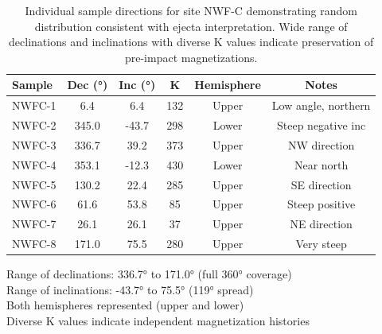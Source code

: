 
\begin{table}[htbp]
    \centering
    \caption{Individual sample directions for site NWF-C demonstrating random distribution consistent with ejecta interpretation. Wide range of declinations and inclinations with diverse K values indicate preservation of pre-impact magnetizations.}
    \label{tab:nwfc_details}
    \footnotesize
    \begin{tabular}{|l|c|c|c|c|c|}
        \hline
        \textbf{Sample} & \textbf{Dec (°)} & \textbf{Inc (°)} & \textbf{K} & \textbf{Hemisphere} & \textbf{Notes} \\
        \hline
        NWFC-1 & 6.4 & 6.4 & 132 & Upper & Low angle, northern \\
        NWFC-2 & 345.0 & -43.7 & 298 & Lower & Steep negative inc \\
        NWFC-3 & 336.7 & 39.2 & 373 & Upper & NW direction \\
        NWFC-4 & 353.1 & -12.3 & 430 & Lower & Near north \\
        NWFC-5 & 130.2 & 22.4 & 285 & Upper & SE direction \\
        NWFC-6 & 61.6 & 53.8 & 85 & Upper & Steep positive \\
        NWFC-7 & 26.1 & 26.1 & 37 & Upper & NE direction \\
        NWFC-8 & 171.0 & 75.5 & 280 & Upper & Very steep \\
        \hline
    \end{tabular}
    
    \vspace{0.5em}
    \raggedright
    \footnotesize
    Range of declinations: 336.7° to 171.0° (full 360° coverage)\\
    Range of inclinations: -43.7° to 75.5° (119° spread)\\
    Both hemispheres represented (upper and lower)\\
    Diverse K values indicate independent magnetization histories
\end{table}


